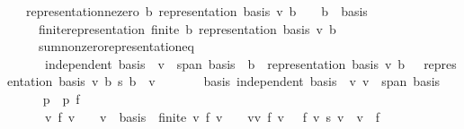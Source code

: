 \begin{isabellebody}
%
\isadelimproof
\isanewline
%
\endisadelimproof
\isanewline
{}\isamarkupfalse%
\isanewline
\ \ \ representation{\isacharunderscore}{\kern0pt}ne{\isacharunderscore}{\kern0pt}zero{\isacharcolon}{\kern0pt}\ {\isachardoublequoteopen}{\isasymAnd}b{\isachardot}{\kern0pt}\ representation\ basis\ v\ b\ {\isasymnoteq}\ {}\ {\isasymLongrightarrow}\ b\ {\isasymin}\ basis{\isachardoublequoteclose}\isanewline
\ \ \ \ \ finite{\isacharunderscore}{\kern0pt}representation{\isacharcolon}{\kern0pt}\ {\isachardoublequoteopen}finite\ {\isacharbraceleft}{\kern0pt}b{\isachardot}{\kern0pt}\ representation\ basis\ v\ b\ {\isasymnoteq}\ {}{\isacharbraceright}{\kern0pt}{\isachardoublequoteclose}\isanewline
\ \ \ \ \ sum{\isacharunderscore}{\kern0pt}nonzero{\isacharunderscore}{\kern0pt}representation{\isacharunderscore}{\kern0pt}eq{\isacharcolon}{\kern0pt}\isanewline
\ \ \ \ \ \ {\isachardoublequoteopen}independent\ basis\ {\isasymLongrightarrow}\ v\ {\isasymin}\ span\ basis\ {\isasymLongrightarrow}\ {\isacharparenleft}{\kern0pt}{\isasymSum}b\ {\isacharbar}{\kern0pt}\ representation\ basis\ v\ b\ {\isasymnoteq}\ {}{\isachardot}{\kern0pt}\ representation\ basis\ v\ b\ {\isacharasterisk}{\kern0pt}s\ b{\isacharparenright}{\kern0pt}\ {\isacharequal}{\kern0pt}\ v{\isachardoublequoteclose}\isanewline
%
\isadelimproof
%
\endisadelimproof
%
\isatagproof
{}\isamarkupfalse%
\ {\isacharminus}{\kern0pt}\isanewline
\ \ \isacommand{{\isacharbraceleft}{\kern0pt}}\isamarkupfalse%
\ \isamarkupfalse%
\ basis{\isacharcolon}{\kern0pt}\ {\isachardoublequoteopen}independent\ basis{\isachardoublequoteclose}\ \ v{\isacharcolon}{\kern0pt}\ {\isachardoublequoteopen}v\ {\isasymin}\ span\ basis{\isachardoublequoteclose}\isanewline
\ \ \ \ \isamarkupfalse%
\ p\ \ {\isachardoublequoteopen}p\ f\ {\isasymlongleftrightarrow}\isanewline
\ \ \ \ \ \ {\isacharparenleft}{\kern0pt}{\isasymforall}v{\isachardot}{\kern0pt}\ f\ v\ {\isasymnoteq}\ {}\ {\isasymlongrightarrow}\ v\ {\isasymin}\ basis{\isacharparenright}{\kern0pt}\ {\isasymand}\ finite\ {\isacharbraceleft}{\kern0pt}v{\isachardot}{\kern0pt}\ f\ v\ {\isasymnoteq}\ {}{\isacharbraceright}{\kern0pt}\ {\isasymand}\ {\isacharparenleft}{\kern0pt}{\isasymSum}v{\isasymin}{\isacharbraceleft}{\kern0pt}v{\isachardot}{\kern0pt}\ f\ v\ {\isasymnoteq}\ {}{\isacharbraceright}{\kern0pt}{\isachardot}{\kern0pt}\ f\ v\ {\isacharasterisk}{\kern0pt}s\ v{\isacharparenright}{\kern0pt}\ {\isacharequal}{\kern0pt}\ v{\isachardoublequoteclose}\ \ f\isanewline

\end{isabellebody}
